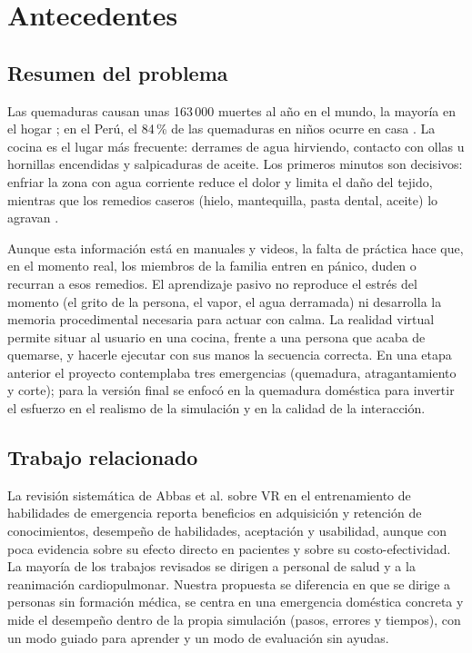 \documentclass[11pt,a4paper]{article}
\begin{document}
\tableofcontents
\newpage

\section{Antecedentes}

\subsection{Resumen del problema}
Las quemaduras causan unas 163\,000 muertes al año en el mundo, la mayoría en el hogar \cite{who}; en el Perú, el 84\,\% de las quemaduras en niños ocurre en casa \cite{minsa}. La cocina es el lugar más frecuente: derrames de agua hirviendo, contacto con ollas u hornillas encendidas y salpicaduras de aceite. Los primeros minutos son decisivos: enfriar la zona con agua corriente reduce el dolor y limita el daño del tejido, mientras que los remedios caseros (hielo, mantequilla, pasta dental, aceite) lo agravan \cite{nhs,ifrc}.

Aunque esta información está en manuales y videos, la falta de práctica hace que, en el momento real, los miembros de la familia entren en pánico, duden o recurran a esos remedios. El aprendizaje pasivo no reproduce el estrés del momento (el grito de la persona, el vapor, el agua derramada) ni desarrolla la memoria procedimental necesaria para actuar con calma. La realidad virtual permite situar al usuario en una cocina, frente a una persona que acaba de quemarse, y hacerle ejecutar con sus manos la secuencia correcta. En una etapa anterior el proyecto contemplaba tres emergencias (quemadura, atragantamiento y corte); para la versión final se enfocó en la quemadura doméstica para invertir el esfuerzo en el realismo de la simulación y en la calidad de la interacción.

\subsection{Trabajo relacionado}
La revisión sistemática de Abbas et al. \cite{abbas2023} sobre VR en el entrenamiento de habilidades de emergencia reporta beneficios en adquisición y retención de conocimientos, desempeño de habilidades, aceptación y usabilidad, aunque con poca evidencia sobre su efecto directo en pacientes y sobre su costo-efectividad. La mayoría de los trabajos revisados se dirigen a personal de salud y a la reanimación cardiopulmonar. Nuestra propuesta se diferencia en que se dirige a personas sin formación médica, se centra en una emergencia doméstica concreta y mide el desempeño dentro de la propia simulación (pasos, errores y tiempos), con un modo guiado para aprender y un modo de evaluación sin ayudas.
\end{document}
